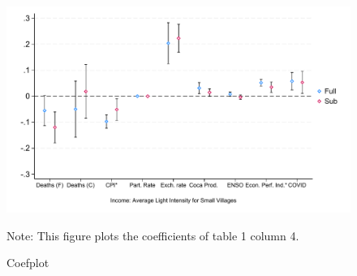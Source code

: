 \documentclass[12 pt,fullpage]{article}
\theoremstyle{plain}
\begin{document}
\newpage
\begin{figure}[h!]
	\begin{center}
		\includegraphics[width=1\textwidth]{./Figures/Figure_coef_plot.pdf}
		\caption{Coefplot}
		\label{fig:coefplot} 
	\end{center}
	{\scriptsize Note: This figure plots the coefficients of table 1 column 4.}
\end{figure}


\newpage
\begin{table}[h!]
	\begin{center}
		\scalebox{0.4}{
			}
		\caption{}
	\end{center}
\end{table}
\end{document}
